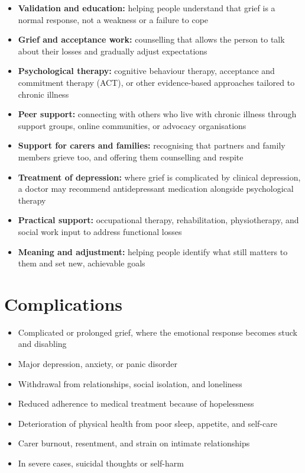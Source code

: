 \begin{itemize}
    \item \textbf{Validation and education:} helping people understand that grief is a normal response, not a weakness or a failure to cope
    \item \textbf{Grief and acceptance work:} counselling that allows the person to talk about their losses and gradually adjust expectations
    \item \textbf{Psychological therapy:} cognitive behaviour therapy, acceptance and commitment therapy (ACT), or other evidence-based approaches tailored to chronic illness
    \item \textbf{Peer support:} connecting with others who live with chronic illness through support groups, online communities, or advocacy organisations
    \item \textbf{Support for carers and families:} recognising that partners and family members grieve too, and offering them counselling and respite
    \item \textbf{Treatment of depression:} where grief is complicated by clinical depression, a doctor may recommend antidepressant medication alongside psychological therapy
    \item \textbf{Practical support:} occupational therapy, rehabilitation, physiotherapy, and social work input to address functional losses
    \item \textbf{Meaning and adjustment:} helping people identify what still matters to them and set new, achievable goals
\end{itemize}

\section*{Complications}
\begin{itemize}
    \item Complicated or prolonged grief, where the emotional response becomes stuck and disabling
    \item Major depression, anxiety, or panic disorder
    \item Withdrawal from relationships, social isolation, and loneliness
    \item Reduced adherence to medical treatment because of hopelessness
    \item Deterioration of physical health from poor sleep, appetite, and self-care
    \item Carer burnout, resentment, and strain on intimate relationships
    \item In severe cases, suicidal thoughts or self-harm
\end{itemize}

